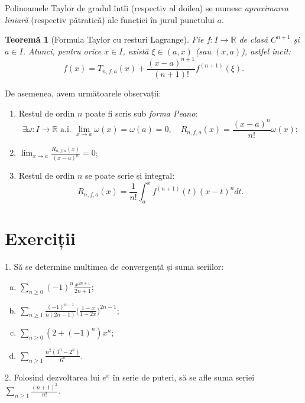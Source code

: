 \documentclass[11pt,a4paper]{article}
\newcommand\ds{\displaystyle}
\newcommand\ai{\text{ a.\^{i}. }}
\newcommand\RR{\mathbb{R}}
\theoremstyle{dotless}
\newtheorem{theorem}{Teorem\u{a}}[section]
\theoremstyle{dotlessdr}
\begin{document}
Polinoamele Taylor de gradul întîi (respectiv al doilea) se numesc
\emph{aproximarea liniară} (respectiv pătratică) ale funcției în jurul
punctului $a$.

\begin{theorem}[Formula Taylor cu resturi Lagrange]\label{thm:taylor-lagr}
  Fie $f : I \to \RR$ de clasă $C^{n + 1}$ și $a \in I$. Atunci, pentru orice
  $x \in I$, există $\xi \in (a, x)$ (sau $(x, a)$), astfel încît:
  \[
    f(x) = T_{n, f, a}(x) + \frac{(x - a)^{n + 1}}{(n + 1)!} f^{(n + 1)}(\xi).
  \]
\end{theorem}

De asemenea, avem următoarele observații:
\begin{enumerate}[(1)]
\item Restul de ordin $n$ poate fi scris sub \emph{forma Peano}:
  \[
    \exists \omega : I \to \RR \ai \lim_{x \to a} \omega(x) = \omega(a) = 0, \quad %
    R_{n, f, a}(x) = \frac{(x - a)^n}{n!} \omega(x);
  \]
\item $\ds\lim_{x \to a} \frac{R_{n, f, a}(x)}{(x - a)^n} = 0$;
\item Restul de ordin $n$ se poate scrie și integral:
  \[
    R_{n, f, a}(x) = \frac{1}{n!} \int_a^x f^{(n + 1)}(t) (x - t)^n dt.
  \]
\end{enumerate}


\section{Exerciții}


1. Să se determine mulțimea de convergență și suma seriilor:
\begin{enumerate}[(a)]
\item $\ds\sum_{n \geq 0} (-1)^n \frac{x^{2n + 1}}{2n + 1}$;
\item $\ds\sum_{n \geq 1} \frac{(-1)^{n-1}}{n(2n-1)} \big( \frac{1-x}{1 - 2x} \big)^{2n - 1}$;
\item $\ds\sum_{n \geq 0} (2 + (-1)^n) x^n$;
\item $\ds\sum_{n \geq 1} \frac{n^2(3^n - 2^n)}{6^n}$.
\end{enumerate}

\vspace{1cm}

2. Folosind dezvoltarea lui $e^x$ în serie de puteri, să se afle suma seriei $\ds\sum_{n \geq 1} \frac{(n + 1)^2}{n!}$.

\vspace{1cm}
\end{document}
